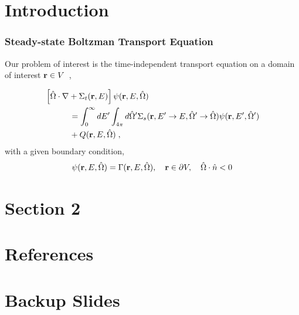 \documentclass[xcolor=x11names, compress, handout]{beamer}
\begin{document}
\section{Introduction}
\begin{frame}
  \frametitle{Steady-state Boltzman Transport Equation}
  Our problem of interest is the time-independent transport equation
  on a domain of interest $\mathbf{r} \in V$~\cite{lewis1993},
  
\begin{align*}
  &\left[ \hat{\Omega}\cdot  \nabla + \Sigma_t(\mathbf{r},E) \right] \psi(\mathbf{r},E,\hat{\Omega})\\
  & \quad \quad \quad= \int_0^{\infty}dE'\int_{4\pi}d\hat{\Omega}'\Sigma_s(\mathbf{r}, E'\rightarrow E,\hat{\Omega}'\rightarrow\hat{\Omega})
    \psi(\mathbf{r},E',\hat{\Omega}') \\ & \quad \quad \quad+ Q(\mathbf{r}, E, \hat{\Omega})\;,
\end{align*}
with a given boundary condition,
\begin{align*}
  \psi(\mathbf{r},E,\hat{\Omega}) = \Gamma(\mathbf{r}, E, \hat{\Omega}), \quad \mathbf{r} \in \partial V,
  \quad \hat{\Omega} \cdot \hat{n} < 0
\end{align*}  
\end{frame}

\section{Section 2}

\section{References}


\appendix

\section{Backup Slides}

\end{document}

